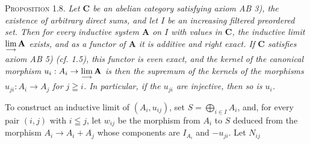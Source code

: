 \textsc{Proposition 1.8.} \textit{Let $\mathbf{C}$ be an abelian category
satisfying axiom \textup{AB 3)}, the existence of arbitrary direct sums, and let $I$ be
an increasing filtered preordered set. Then for every inductive system
$\mathbf A$ on $I$ with values in $\mathbf{C}$, the inductive limit
$\mathop{\rm lim}\limits_{\longrightarrow}\mathbf A$ exists, and as a functor
of $\mathbf A$ it is additive and right exact. If $\mathbf{C}$ satisfies axiom \textup{AB 5)}
\textup{(\textit{cf.} 1.5)}, this functor is even exact, and the kernel of the canonical
morphism
$u_i:A_i\to\mathop{\rm lim}\limits_{\longrightarrow}\mathbf A$
is then the supremum of the kernels of the morphisms
$u_{ji}:A_i\to A_j$ for $j\geqq i$. In particular, if the $u_{ji}$
are injective, then so is $u_i$.}

To construct an inductive limit of $(A_i,u_{ij})$, set $S=\displaystyle\bigoplus_{i\in I}A_i$, and, for every pair $(i,j)$ with $i\leqq j$, let $w_{ij}$ be the
morphism from $A_i$ to $S$ deduced from the morphism
$A_i\to A_i+A_j$ whose components are $I_{A_i}$ and $-u_{ji}$.
Let $N_{ij}$

